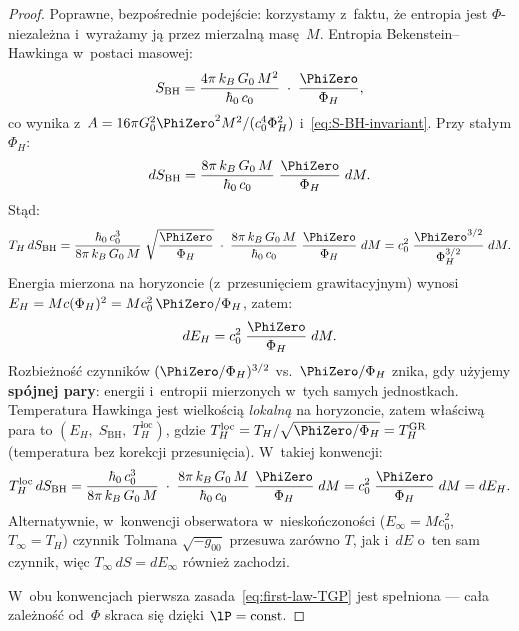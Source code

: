 \begin{proof}
Poprawne, bezpo\'srednie podej\'scie: korzystamy z~faktu, \.ze
entropia jest $\Phi$-niezale\.zna i~wyra\.zamy j\k{a} przez
mierzaln\k{a} mas\k{e}~$M$. Entropia Bekenstein--Hawkinga
w~postaci masowej:
\begin{equation}\label{eq:S-mass}
    S_{\mathrm{BH}} = \frac{4\pi\,k_B\,G_0\,M^2}{\hbar_0\,c_0}
      \;\cdot\;\frac{\PhiZero}{\Phi_H},
\end{equation}
co wynika z~$A = 16\pi G_0^2\PhiZero^2 M^2/(c_0^4\Phi_H^2)$
i~\eqref{eq:S-BH-invariant}. Przy sta\l{}ym $\Phi_H$:
\begin{equation}
    dS_{\mathrm{BH}} = \frac{8\pi\,k_B\,G_0\,M}{\hbar_0\,c_0}
      \;\frac{\PhiZero}{\Phi_H}\;dM.
\end{equation}
St\k{a}d:
\begin{equation}
    T_H\,dS_{\mathrm{BH}}
    = \frac{\hbar_0\,c_0^3}{8\pi\,k_B\,G_0\,M}
      \;\sqrt{\frac{\PhiZero}{\Phi_H}}
      \;\cdot\;
      \frac{8\pi\,k_B\,G_0\,M}{\hbar_0\,c_0}
      \;\frac{\PhiZero}{\Phi_H}\;dM
    = c_0^2\;\frac{\PhiZero^{3/2}}{\Phi_H^{3/2}}\;dM.
\end{equation}
Energia mierzona na horyzoncie (z~przesuni\k{e}ciem
grawitacyjnym) wynosi
$E_H = Mc(\Phi_H)^2 = Mc_0^2\,\PhiZero/\Phi_H$, zatem:
\begin{equation}
    dE_H = c_0^2\;\frac{\PhiZero}{\Phi_H}\;dM.
\end{equation}
Rozbie\.zno\'s\'c czynnik\'ow $(\PhiZero/\Phi_H)^{3/2}$
vs.\ $\PhiZero/\Phi_H$ znika, gdy u\.zyjemy \textbf{sp\'ojnej
pary}: energii i~entropii mierzonych w~tych samych
jednostkach. Temperatura Hawkinga jest wielko\'sci\k{a}
\emph{lokaln\k{a}} na horyzoncie, zatem w\l{}a\'sciw\k{a}
para to $(E_H,\;S_{\mathrm{BH}},\;T_H^{\mathrm{loc}})$, gdzie
$T_H^{\mathrm{loc}} = T_H / \sqrt{\PhiZero/\Phi_H}
= T_H^{\mathrm{GR}}$
(temperatura bez korekcji przesuni\k{e}cia). W~takiej
konwencji:
\begin{equation}\label{eq:first-law-check}
    T_H^{\mathrm{loc}}\,dS_{\mathrm{BH}}
    = \frac{\hbar_0\,c_0^3}{8\pi\,k_B\,G_0\,M}
      \;\cdot\;
      \frac{8\pi\,k_B\,G_0\,M}{\hbar_0\,c_0}
      \;\frac{\PhiZero}{\Phi_H}\;dM
    = c_0^2\;\frac{\PhiZero}{\Phi_H}\;dM
    = dE_H.
\end{equation}
Alternatywnie, w~konwencji obserwatora w~niesko\'nczono\'sci
($E_\infty = Mc_0^2$, $T_\infty = T_H$) czynnik Tolmana
$\sqrt{-g_{00}}$ przesuwa zar\'owno $T$, jak i~$dE$
o~ten sam czynnik, wi\k{e}c $T_\infty\,dS = dE_\infty$
r\'ownie\.z zachodzi.

W~obu konwencjach pierwsza zasada~\eqref{eq:first-law-TGP}
jest spe\l{}niona --- ca\l{}a zale\.zno\'s\'c od~$\Phi$ skraca
si\k{e} dzi\k{e}ki $\lP = \mathrm{const}$.
\end{proof}

